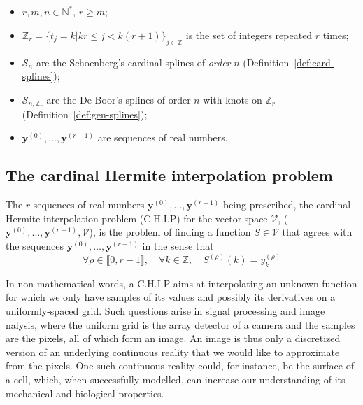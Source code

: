 \begin{itemize}
  \itemsep0em
  \item $r, m, n \in \mathbb{N}^*$, $r \geq m$;
  \item $\mathbb{Z}_r = {\{ t_j=k | kr \leq j < k(r+1) \}}_{j \in \mathbb{Z}}$ is the set of integers repeated $r$ 
    times;
  \item $\mathscr{S}_{n}$ are the Schoenberg's cardinal splines of \emph{order} $n$    
    (Definition~\ref{def:card-splines});
  \item $\mathscr{S}_{n, \mathbb{Z}_r}$ are the De Boor's splines of order $n$ with knots on $\mathbb{Z}_r$ 
    (Definition~\ref{def:gen-splines});
  \item $\bm{y}^{(0)}, \ldots, \bm{y}^{(r-1)}$ are sequences of real numbers.
\end{itemize}

\subsection{The cardinal Hermite interpolation problem}

\begin{deftn}
  The $r$ sequences of real numbers $\bm{y}^{(0)}, \ldots, \bm{y}^{(r-1)}$ being prescribed, the cardinal Hermite 
  interpolation problem (C.H.I.P) for the vector space $\mathcal{V}$, ($\bm{y}^{(0)}, \ldots, \bm{y}^{(r-1)}, 
  \mathcal{V}$), is the problem of finding a function $S \in \mathcal{V}$
  that agrees with the sequences $\bm{y}^{(0)}, \ldots, \bm{y}^{(r-1)}$ in the sense that
  \begin{equation}\label{def:chip}
    \forall \rho \in \llbracket0,r-1\rrbracket, \quad \forall k \in \mathbb{Z}, \quad S^{(\rho)}(k) = y^{(\rho)}_k
  \end{equation}
\end{deftn}
\noindent In non-mathematical words, a C.H.I.P aims at interpolating an unknown function for which we only have samples 
of its values and possibly its derivatives on a uniformly-spaced grid. Such questions arise in signal processing and 
image nalysis, where the uniform grid is the array detector of a camera and the samples are the pixels, all of which 
form an image. An image is thus only a discretized version of an underlying continuous reality that we would like to 
approximate from the pixels. One such continuous reality could, for instance, be the surface of a cell, which, when 
successfully modelled, can increase our understanding of its mechanical and biological properties.\\

